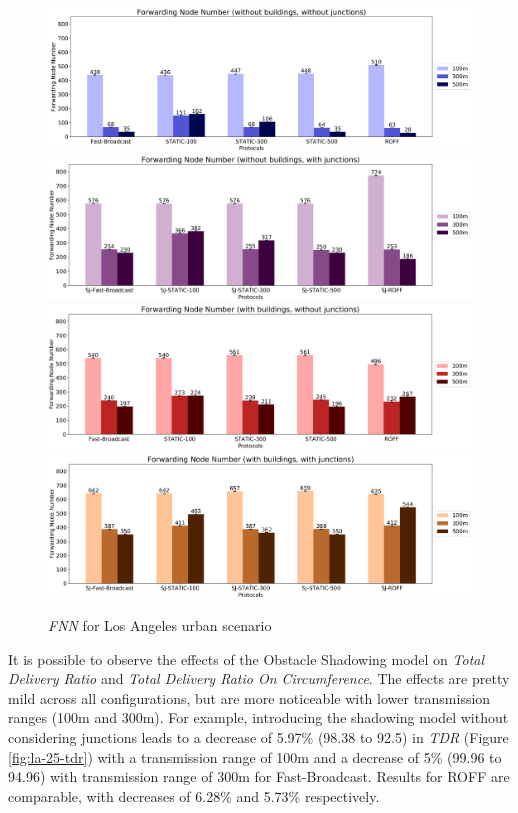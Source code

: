 		\begin{figure}[H]
			\centering
			\includegraphics[width=1.0\textwidth]{immagini/la-25/b0/j0/fnn}
			\includegraphics[width=1.0\textwidth]{immagini/la-25/b0/j1/fnn}
			\includegraphics[width=1.0\textwidth]{immagini/la-25/b1/j0/fnn}
			\includegraphics[width=1.0\textwidth]{immagini/la-25/b1/j1/fnn}
			\caption{\textit{FNN} for Los Angeles urban scenario}
			\label{fig:la-25-fnn}
		\end{figure}
	
		It is possible to observe the effects of the Obstacle Shadowing model on \textit{Total Delivery Ratio} and \textit{Total Delivery Ratio On Circumference}. The effects are pretty mild across all configurations, but are more noticeable with lower transmission ranges (100m and 300m). For example, introducing the shadowing model without considering junctions leads to a decrease of 5.97\% (98.38 to 92.5) in \textit{TDR} (Figure \ref{fig:la-25-tdr}) with a transmission range of 100m and a decrease of 5\% (99.96 to 94.96) with transmission range of 300m for Fast-Broadcast. Results for ROFF are comparable, with decreases of 6.28\% and 5.73\% respectively.
		

